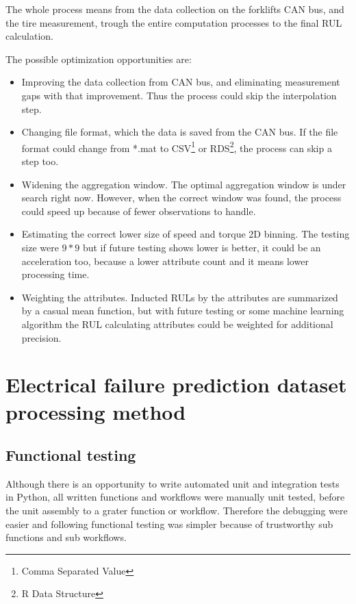 The whole process means from the data collection on the forklifts CAN bus, and the tire measurement, trough the entire computation processes to the final RUL calculation.

The possible optimization opportunities are:
\begin{itemize}
	\item{Improving the data collection from CAN bus, and eliminating measurement gaps with that improvement.} Thus the process could skip the interpolation step. 
	\item{Changing file format, which the data is saved from the CAN bus.} If the file format could change from *.mat to CSV\footnote{Comma Separated Value} or RDS\footnote{R Data Structure}, the process can skip a step too.
	\item{Widening the aggregation window.} The optimal aggregation window is under search right now. However, when the correct window was found, the process could speed up because of fewer observations to handle.
	\item{Estimating the correct lower size of speed and torque 2D binning.} The testing size were $9*9$ but if future testing shows lower is better, it could be an acceleration too, because a lower attribute count and it means lower processing time.
	\item{Weighting the attributes.} Inducted RULs by the attributes are summarized by a casual mean function, but with future testing or some machine learning algorithm the RUL calculating attributes could be weighted for additional precision.
\end{itemize} 
\section{Electrical failure prediction dataset processing method}
\subsection{Functional testing}
Although there is an opportunity to write automated unit and integration tests in Python, all written functions and workflows were manually unit tested, before the unit assembly to a grater function or workflow. Therefore the debugging were easier and following functional testing was simpler because of trustworthy sub functions and sub workflows.

